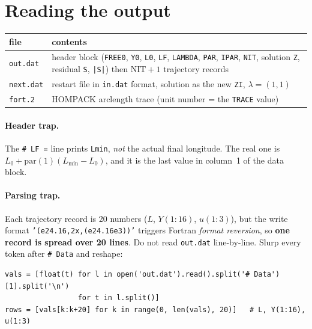 \documentclass[11pt]{article}
\newcommand{\code}[1]{\texttt{\small #1}}
\newcommand{\file}[1]{\texttt{\small #1}}
\begin{document}
\section{Reading the output}\label{sec:output}

\begin{center}
\begin{tabular}{@{}lp{9.6cm}@{}}
\toprule
file & contents\\
\midrule
\file{out.dat} & header block (\code{FREE0}, \code{Y0}, \code{L0}, \code{LF},
\code{LAMBDA}, \code{PAR}, \code{IPAR}, \code{NIT}, solution \code{Z},
residual \code{S}, \code{|S|}) then $\mathrm{NIT}+1$ trajectory records\\
\file{next.dat} & restart file in \file{in.dat} format, solution as the new
\code{ZI}, $\lambda = (1,1)$\\
\file{fort.2} & HOMPACK arclength trace (unit number = the \code{TRACE} value)\\
\bottomrule
\end{tabular}
\end{center}

\paragraph{Header trap.} The \code{\# LF =} line prints \code{Lmin}, \emph{not}
the actual final longitude. The real one is
$L_0 + \mathrm{par}(1)(L_{\min}-L_0)$, and it is the last value in column~1 of
the data block.

\paragraph{Parsing trap.} Each trajectory record is 20 numbers
($L$, $Y(1{:}16)$, $u(1{:}3)$), but the write format
\code{'(e24.16,2x,(e24.16e3))'} triggers Fortran \emph{format reversion}, so
\textbf{one record is spread over 20 lines}. Do not read \file{out.dat}
line-by-line. Slurp every token after \code{\# Data} and reshape:

\begin{lstlisting}[style=py]
vals = [float(t) for l in open('out.dat').read().split('# Data')[1].split('\n')
                 for t in l.split()]
rows = [vals[k:k+20] for k in range(0, len(vals), 20)]   # L, Y(1:16), u(1:3)
\end{lstlisting}
\end{document}
